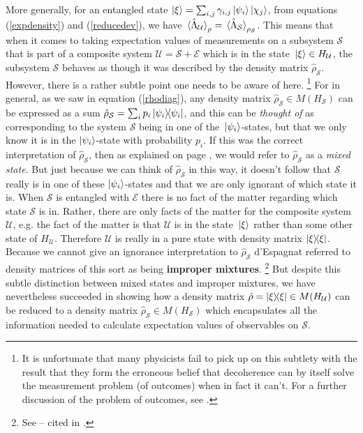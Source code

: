 \documentclass[letter, 12pt]{turabian-thesis}
\theoremstyle{hypothesis}
\let\origfootnote\footnote %
\renewcommand{\footnote}[1]{%
\noindent %
\origfootnote{#1}}
\begin{document}
More generally, \label{subtle}for an entangled state $\ket{\xi}=\sum_{i,j}\gamma_{i,j}\ket{\psi_i}\ket{\chi_j}$, from equations (\ref{expdensity}) and (\ref{reducedev}), we have  $\ev*{\hat{\Lambda}_\mathcal{U}}_\rho=\ev*{\hat{\Lambda}_\mathcal{S}}_{\rho_\mathcal{S}}$. This means that when it comes to taking expectation values of measurements on a subsystem $\mathcal{S}$ that is part of a composite system $\mathcal{U}=\mathcal{S}+\mathcal{E}$ which is in the state $\ket*{\xi}\in H_\mathcal{U}$, the subsystem $\mathcal{S}$ behaves as though it was described by the density matrix $\hat{\rho}_\mathcal{S}$. However, there is a rather subtle point one needs to be aware of here.\footnote{It is unfortunate that many physicists fail to pick up on this subtlety with the result that they form the erroneous belief that decoherence can by itself solve the measurement problem (of outcomes) when in fact it can't. For a further discussion of the problem of outcomes, see \cite[57-60]{Schlosshauer}.} 
For in general, as we saw in equation (\ref{rhodiag}),  any density matrix $\hat{\rho}_\mathcal{S}\in M(H_\mathcal{S})$ can be expressed as a sum $\hat{\rho}_\mathcal{S}=\sum_i p_i\dyad{\psi_i}$, and this can be \emph{thought of} as corresponding to the system $\mathcal{S}$ being in one of the $\ket*{\psi_i}$-states, but that we only know it is in the $\ket{\psi_i}$-state with probability $p_i$. If this was the correct interpretation of  $\hat{\rho}_\mathcal{S}$, then as explained on page \pageref{mixedstate}, we would refer to  $\hat{\rho}_\mathcal{S}$ as a \emph{mixed state}. But just because we can think of $\hat{\rho}_\mathcal{S}$ in this way, it doesn't follow that $\mathcal{S}$ really is in one of these $\ket{\psi_i}$-states and that we are only ignorant of which state it is. When $\mathcal{S}$ is entangled with $\mathcal{E}$ there is no fact of the matter regarding which state $\mathcal{S}$ is in. Rather, there are only facts of the matter for the composite system $\mathcal{U}$, e.g. the fact of the matter is that $\mathcal{U}$ is in the state $\ket*{\xi}$ rather than some other state of $H_\mathcal{U}$. Therefore $\mathcal{U}$ is really in a pure state with density matrix $\dyad{\xi}$. Because we cannot give an ignorance interpretation to  $\hat{\rho}_\mathcal{S}$ d’Espagnat\label{Espagnat} referred to density matrices of this sort as being \textbf{improper mixtures}.\footnote{See \cite[ch. 6.2]{Espagnat} -- cited in \cite[p. 19]{Butterfield}.} But despite this subtle distinction between mixed states and improper mixtures, we have nevertheless succeeded in showing how a density matrix $\hat{\rho}=\dyad{\xi}\in M(H_\mathcal{U})$ can be reduced to a density matrix $\hat{\rho}_\mathcal{S}\in M(H_\mathcal{S})$ which encapsulates all the information needed to calculate expectation values of observables on $\mathcal{S}$.\label{subtleend} 
\end{document}
